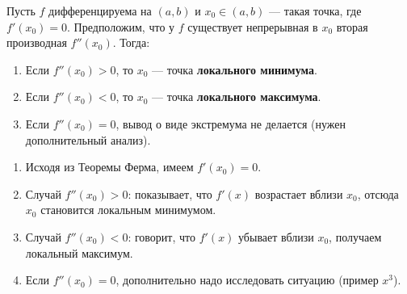 
\begin{customtheorem}
	Пусть $f$ дифференцируема на $(a,b)$ и $x_0 \in (a,b)$ — такая точка,
	где $f'(x_0)=0$. Предположим, что у $f$ существует непрерывная в $x_0$
	вторая производная $f''(x_0)$. Тогда:

	\begin{enumerate}
		\item Если $f''(x_0)>0$, то $x_0$ — точка \textbf{локального минимума}.
		\item Если $f''(x_0)<0$, то $x_0$ — точка \textbf{локального максимума}.
		\item Если $f''(x_0)=0$, вывод о виде экстремума не делается
		      (нужен дополнительный анализ).
	\end{enumerate}
\end{customtheorem}

\begin{proofplan}
	\begin{enumerate}
		\item Исходя из Теоремы Ферма, имеем $f'(x_0)=0$.
		\item Случай $f''(x_0)>0$: показывает, что $f'(x)$ возрастает вблизи $x_0$,
		      отсюда $x_0$ становится локальным минимумом.
		\item Случай $f''(x_0)<0$: говорит, что $f'(x)$ убывает вблизи $x_0$,
		      получаем локальный максимум.
		\item Если $f''(x_0)=0$, дополнительно надо исследовать ситуацию (пример $x^3$).
	\end{enumerate}
\end{proofplan}

